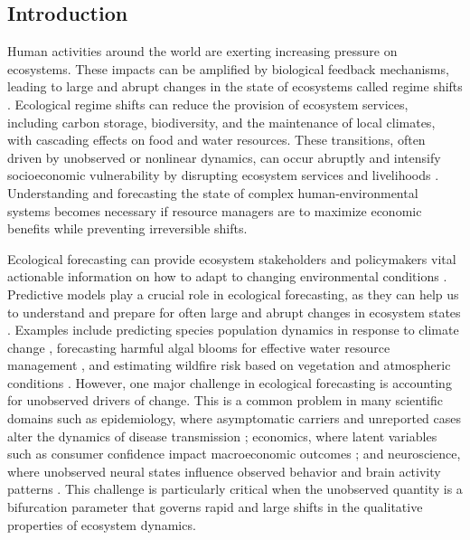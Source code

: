 \documentclass[openacc]{rsproca_new}%
\begin{document}


\begin{fmtext}
\section{Introduction}   

Human activities around the world are exerting increasing pressure on ecosystems. These impacts can be amplified by biological feedback mechanisms, leading to large and abrupt changes in the state of ecosystems called regime shifts \cite{scheffer2001catastrophic}. Ecological regime shifts can reduce the provision of ecosystem services, including carbon storage, biodiversity, and the maintenance of local climates, with cascading effects on food and water resources. These transitions, often driven by unobserved or nonlinear dynamics, can occur abruptly and intensify socioeconomic vulnerability by disrupting ecosystem services and livelihoods \cite{staver2011,turner2020climate, Biggs2018}. Understanding and forecasting the state of complex human-environmental systems becomes necessary if resource managers are to maximize economic benefits while preventing irreversible shifts. 

\end{fmtext}

\maketitle
\newpage

Ecological forecasting can provide ecosystem stakeholders and policymakers vital actionable information on how to adapt to changing environmental conditions \cite{dietze2017ecological, dietze2024near}. Predictive models play a crucial role in ecological forecasting, as they can help us to understand and prepare for often large and abrupt changes in ecosystem states \cite{clark2001ecological, kickert1999predictive, griffith2014new}. Examples include predicting species population dynamics in response to climate change \cite{urban2016improving}, forecasting harmful algal blooms for effective water resource management \cite{anderson2012progress}, and estimating wildfire risk based on vegetation and atmospheric conditions \cite{abatzoglou2016impact}. However, one major challenge in ecological forecasting is accounting for unobserved drivers of change. This is a common problem in many scientific domains such as epidemiology, where asymptomatic carriers and unreported cases alter the dynamics of disease transmission \cite{fraser2004factors}; economics, where latent variables such as consumer confidence impact macroeconomic outcomes \cite{stock2016dynamic}; and neuroscience, where unobserved neural states influence observed behavior and brain activity patterns \cite{paninski2010new}. This challenge is particularly critical when the unobserved quantity is a bifurcation parameter that governs rapid and large shifts in the qualitative properties of ecosystem dynamics. 
\end{document}

